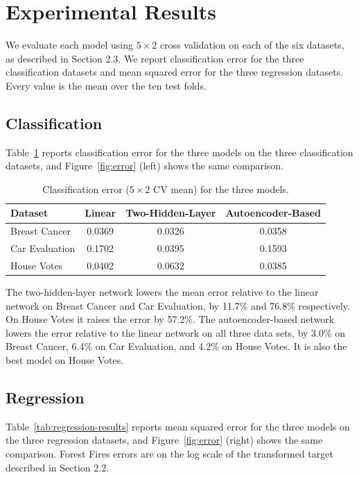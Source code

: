 \documentclass[twoside,11pt]{article}
\begin{document}
\section{Experimental Results}
We evaluate each model using $5 \times 2$ cross validation on each of the six datasets, as described in Section 2.3. We report classification error for the three classification datasets and mean squared error for the three regression datasets. Every value is the mean over the ten test folds.

\subsection{Classification}
Table~\ref{tab:classification-results} reports classification error for the three models on the three classification datasets, and Figure~\ref{fig:error} (left) shows the same comparison.

\begin{table}[h]
    \centering
    \begin{tabular}{lccc}
    \hline
    Dataset & Linear & Two-Hidden-Layer & Autoencoder-Based \\
    \hline
    Breast Cancer   & 0.0369 & 0.0326 & 0.0358 \\
    Car Evaluation  & 0.1702 & 0.0395 & 0.1593 \\
    House Votes     & 0.0402 & 0.0632 & 0.0385 \\
    \hline
    \end{tabular}
    \caption{Classification error ($5 \times 2$ CV mean) for the three models.}
    \label{tab:classification-results}
\end{table}

The two-hidden-layer network lowers the mean error relative to the linear network on Breast Cancer and Car Evaluation, by 11.7\% and 76.8\% respectively. On House Votes it raises the error by 57.2\%. The autoencoder-based network lowers the error relative to the linear network on all three data sets, by 3.0\% on Breast Cancer, 6.4\% on Car Evaluation, and 4.2\% on House Votes. It is also the best model on House Votes.

\subsection{Regression}
Table~\ref{tab:regression-results} reports mean squared error for the three models on the three regression datasets, and Figure~\ref{fig:error} (right) shows the same comparison. Forest Fires errors are on the log scale of the transformed target described in Section 2.2.
\end{document}
